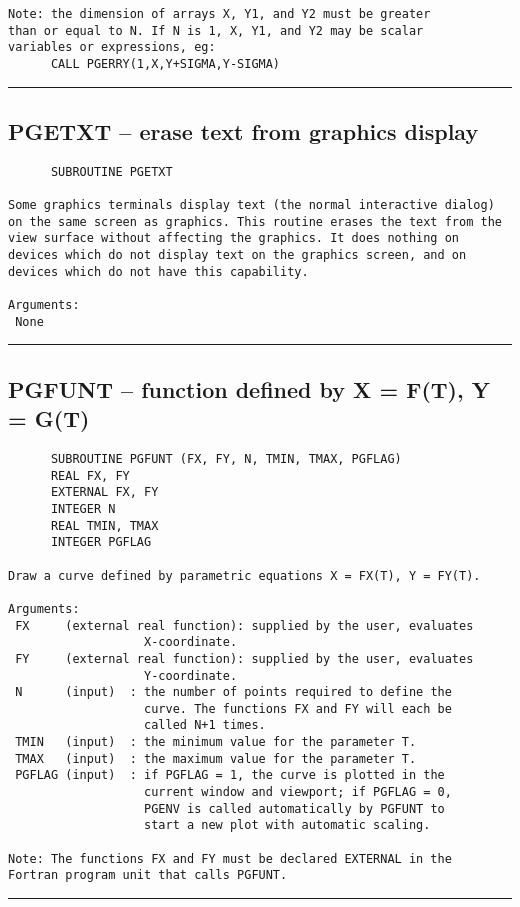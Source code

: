 {\begin{verbatim}
Note: the dimension of arrays X, Y1, and Y2 must be greater
than or equal to N. If N is 1, X, Y1, and Y2 may be scalar
variables or expressions, eg:
      CALL PGERRY(1,X,Y+SIGMA,Y-SIGMA)
\end{verbatim}
\hrule


\subsection*{PGETXT -- erase text from graphics display }
\begin{verbatim}
      SUBROUTINE PGETXT

Some graphics terminals display text (the normal interactive dialog)
on the same screen as graphics. This routine erases the text from the
view surface without affecting the graphics. It does nothing on
devices which do not display text on the graphics screen, and on
devices which do not have this capability.

Arguments:
 None
\end{verbatim}
\hrule


\subsection*{PGFUNT -- function defined by X = F(T), Y = G(T) }
\begin{verbatim}
      SUBROUTINE PGFUNT (FX, FY, N, TMIN, TMAX, PGFLAG)
      REAL FX, FY
      EXTERNAL FX, FY
      INTEGER N
      REAL TMIN, TMAX
      INTEGER PGFLAG

Draw a curve defined by parametric equations X = FX(T), Y = FY(T).

Arguments:
 FX     (external real function): supplied by the user, evaluates
                   X-coordinate.
 FY     (external real function): supplied by the user, evaluates
                   Y-coordinate.
 N      (input)  : the number of points required to define the
                   curve. The functions FX and FY will each be
                   called N+1 times.
 TMIN   (input)  : the minimum value for the parameter T.
 TMAX   (input)  : the maximum value for the parameter T.
 PGFLAG (input)  : if PGFLAG = 1, the curve is plotted in the
                   current window and viewport; if PGFLAG = 0,
                   PGENV is called automatically by PGFUNT to
                   start a new plot with automatic scaling.

Note: The functions FX and FY must be declared EXTERNAL in the
Fortran program unit that calls PGFUNT.
\end{verbatim}
\hrule


}
